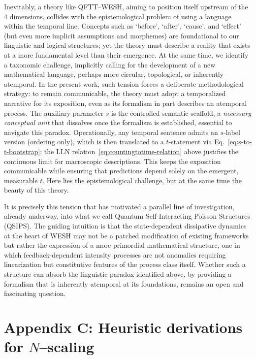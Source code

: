 \documentclass[12pt,a4paper]{article}
\numberwithin{equation}{section}
\begin{document}
\vspace{0.5cm}
Inevitably, a theory like QFTT--WESH, aiming to position itself upstream of the 4 dimensions, collides with the epistemological problem of using a language within the temporal line. Concepts such as `before', `after', `cause', and `effect' (but even more implicit assumptions and morphemes) are foundational to our linguistic and logical structures; yet the theory must describe a reality that exists at a more fundamental level than their emergence. At the same time, we identify a taxonomic challenge, implicitly calling for the development of a new mathematical language, perhaps more circular, topological, or inherently atemporal. In the present work, such tension forces a deliberate methodological strategy: to remain communicable, the theory must adopt a temporalized narrative for its exposition, even as its formalism in part describes an atemporal process. The auxiliary parameter $s$ is the controlled semantic scaffold, a \emph{necessary conceptual unit} that dissolves once the formalism is established, essential to navigate this paradox. Operationally, any temporal sentence admits an $s$-label version (ordering only), which is then translated to a $t$-statement via Eq.~\eqref{eq:s-to-t-bootstrap}; the LLN relation~\eqref{eq:countingtotime-relation} above justifies the continuous limit for macroscopic descriptions. This keeps the exposition communicable while ensuring that predictions depend solely on the emergent, measurable $t$. Here lies the epistemological challenge, but at the same time the beauty of this theory.

\vspace{0.3cm}
\noindent It is precisely this tension that has motivated a parallel line of investigation, already underway, into what we call Quantum Self-Interacting Poisson Structures (QSIPS). The guiding intuition is that the state-dependent dissipative dynamics at the heart of WESH may not be a patched modification of existing frameworks but rather the expression of a more primordial mathematical structure, one in which feedback-dependent intensity processes are not anomalies requiring linearization but constitutive features of the process class itself. Whether such a structure can absorb the linguistic paradox identified above, by providing a formalism that is inherently atemporal at its foundations, remains an open and fascinating question.
\endgroup

\vspace{1cm}

\section*{Appendix C: Heuristic derivations for $N$–scaling}
\label{app:heuristics}
\end{document}
